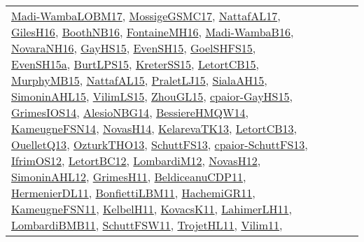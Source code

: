 {\begin{longtable}{lp{3cm}>{\raggedright}p{6cm}>{\raggedright}p{6cm}p{8cm}}
\href{papers/Madi-WambaLOBM17.pdf}{Madi-WambaLOBM17}\cite{Madi-WambaLOBM17}, \href{papers/MossigeGSMC17.pdf}{MossigeGSMC17}\cite{MossigeGSMC17}, \href{articles/NattafAL17.pdf}{NattafAL17}\cite{NattafAL17}, \href{papers/GilesH16.pdf}{GilesH16}\cite{GilesH16}, \href{papers/BoothNB16.pdf}{BoothNB16}\cite{BoothNB16}, \href{papers/FontaineMH16.pdf}{FontaineMH16}\cite{FontaineMH16}, \href{papers/Madi-WambaB16.pdf}{Madi-WambaB16}\cite{Madi-WambaB16}, \href{articles/NovaraNH16.pdf}{NovaraNH16}\cite{NovaraNH16}, \href{papers/GayHS15.pdf}{GayHS15}\cite{GayHS15}, \href{papers/EvenSH15.pdf}{EvenSH15}\cite{EvenSH15}, \href{articles/GoelSHFS15.pdf}{GoelSHFS15}\cite{GoelSHFS15}, \href{articles/EvenSH15a.pdf}{EvenSH15a}\cite{EvenSH15a}, \href{papers/BurtLPS15.pdf}{BurtLPS15}\cite{BurtLPS15}, \href{papers/KreterSS15.pdf}{KreterSS15}\cite{KreterSS15}, \href{articles/LetortCB15.pdf}{LetortCB15}\cite{LetortCB15}, \href{papers/MurphyMB15.pdf}{MurphyMB15}\cite{MurphyMB15}, \href{articles/NattafAL15.pdf}{NattafAL15}\cite{NattafAL15}, \href{papers/PraletLJ15.pdf}{PraletLJ15}\cite{PraletLJ15}, \href{papers/SialaAH15.pdf}{SialaAH15}\cite{SialaAH15}, \href{articles/SimoninAHL15.pdf}{SimoninAHL15}\cite{SimoninAHL15}, \href{papers/VilimLS15.pdf}{VilimLS15}\cite{VilimLS15}, \href{papers/ZhouGL15.pdf}{ZhouGL15}\cite{ZhouGL15}, \href{papers/cpaior-GayHS15.pdf}{cpaior-GayHS15}\cite{cpaior-GayHS15}, \href{articles/GrimesIOS14.pdf}{GrimesIOS14}\cite{GrimesIOS14}, \href{papers/AlesioNBG14.pdf}{AlesioNBG14}\cite{AlesioNBG14}, \href{papers/BessiereHMQW14.pdf}{BessiereHMQW14}\cite{BessiereHMQW14}, \href{articles/KameugneFSN14.pdf}{KameugneFSN14}\cite{KameugneFSN14}, \href{articles/NovasH14.pdf}{NovasH14}\cite{NovasH14}, \href{papers/KelarevaTK13.pdf}{KelarevaTK13}\cite{KelarevaTK13}, \href{papers/LetortCB13.pdf}{LetortCB13}\cite{LetortCB13}, \href{papers/OuelletQ13.pdf}{OuelletQ13}\cite{OuelletQ13}, \href{articles/OzturkTHO13.pdf}{OzturkTHO13}\cite{OzturkTHO13}, \href{papers/SchuttFS13.pdf}{SchuttFS13}\cite{SchuttFS13}, \href{papers/cpaior-SchuttFS13.pdf}{cpaior-SchuttFS13}\cite{cpaior-SchuttFS13}, \href{papers/IfrimOS12.pdf}{IfrimOS12}\cite{IfrimOS12}, \href{papers/LetortBC12.pdf}{LetortBC12}\cite{LetortBC12}, \href{articles/LombardiM12.pdf}{LombardiM12}\cite{LombardiM12}, \href{articles/NovasH12.pdf}{NovasH12}\cite{NovasH12}, \href{papers/SimoninAHL12.pdf}{SimoninAHL12}\cite{SimoninAHL12}, \href{papers/GrimesH11.pdf}{GrimesH11}\cite{GrimesH11}, \href{articles/BeldiceanuCDP11.pdf}{BeldiceanuCDP11}\cite{BeldiceanuCDP11}, \href{papers/HermenierDL11.pdf}{HermenierDL11}\cite{HermenierDL11}, \href{papers/BonfiettiLBM11.pdf}{BonfiettiLBM11}\cite{BonfiettiLBM11}, \href{articles/HachemiGR11.pdf}{HachemiGR11}\cite{HachemiGR11}, \href{papers/KameugneFSN11.pdf}{KameugneFSN11}\cite{KameugneFSN11}, \href{articles/KelbelH11.pdf}{KelbelH11}\cite{KelbelH11}, \href{articles/KovacsK11.pdf}{KovacsK11}\cite{KovacsK11}, \href{papers/LahimerLH11.pdf}{LahimerLH11}\cite{LahimerLH11}, \href{papers/LombardiBMB11.pdf}{LombardiBMB11}\cite{LombardiBMB11}, \href{articles/SchuttFSW11.pdf}{SchuttFSW11}\cite{SchuttFSW11}, \href{articles/TrojetHL11.pdf}{TrojetHL11}\cite{TrojetHL11}, \href{papers/Vilim11.pdf}{Vilim11}\cite{Vilim11}, 
\end{longtable}}

